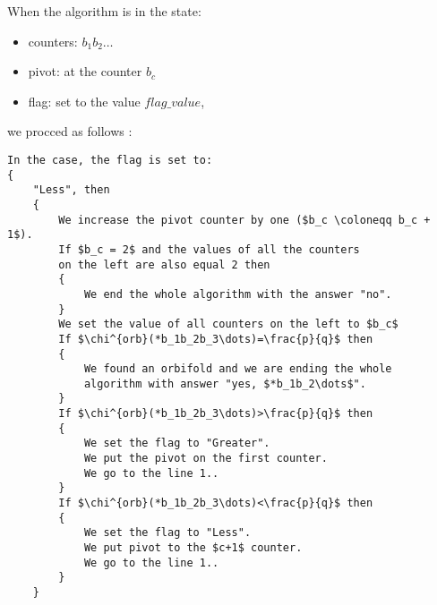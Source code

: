 When the algorithm is in the state: 
\begin{itemize}
\item counters: $b_1b_2\dots$
\item pivot: at the counter $b_c$
\item flag: set to the value $flag\_value$,
\end{itemize}
we procced as follows 
:
\begin{lstlisting}[firstnumber=1,consecutivenumbers=true]
In the case, the flag is set to: 
{
    "Less", then 
    {
        We increase the pivot counter by one ($b_c \coloneqq b_c + 1$).
        If $b_c = 2$ and the values of all the counters 
        on the left are also equal 2 then 
        {
            We end the whole algorithm with the answer "no".
        }
        We set the value of all counters on the left to $b_c$
        If $\chi^{orb}(*b_1b_2b_3\dots)=\frac{p}{q}$ then
        {
            We found an orbifold and we are ending the whole
            algorithm with answer "yes, $*b_1b_2\dots$".
        }
        If $\chi^{orb}(*b_1b_2b_3\dots)>\frac{p}{q}$ then  
        {
            We set the flag to "Greater".
            We put the pivot on the first counter. 
            We go to the line 1..
        } 
        If $\chi^{orb}(*b_1b_2b_3\dots)<\frac{p}{q}$ then
        {
            We set the flag to "Less".
            We put pivot to the $c+1$ counter.
            We go to the line 1..
        } 
    }


\end{lstlisting}
